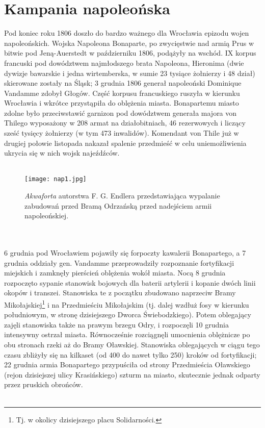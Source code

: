 \documentclass[12pt]{article}
\begin{document}
\section{Kampania napoleońska}

Pod koniec roku 1806 doszło do bardzo ważnego dla Wrocławia epizodu wojen napoleońskich. Wojska Napoleona Bonaparte, po zwycięstwie nad armią Prus w bitwie pod Jeną-Auerstedt w październiku 1806, podążyły na wschód. IX korpus francuski pod dowództwem najmłodszego brata Napoleona, Hieronima (dwie dywizje bawarskie i jedna wirtemberska, w sumie 23 tysiące żołnierzy i 48 dział) skierowane zostały na Śląsk; 3 grudnia 1806 generał napoleoński Dominique Vandamme zdobył Głogów. Część korpusu francuskiego ruszyła w kierunku Wrocławia i wkrótce przystąpiła do oblężenia miasta. Bonapartemu miasto zdolne było przeciwstawić garnizon pod dowództwem generała majora von Thilego wyposażony w 208 armat na działobitniach, 46 rezerwowych i liczący sześć tysięcy żołnierzy (w tym 473 inwalidów). Komendant von Thile już w drugiej połowie listopada nakazał spalenie przedmieść w celu uniemożliwienia ukrycia się w nich wojsk najeźdźców.\\\\
\begin{figure}[h]
    \centering
    \texttt{[image: nap1.jpg]}
    \caption{\textit{Akwaforta} autorstwa F. G. Endlera przedstawiająca wypalanie zabudowań przed Bramą Odrzańską przed nadejściem armii napoleońskiej.}
    \label{fig:nap1}
\end{figure}\\\\
6 grudnia pod Wrocławiem pojawiły się forpoczty kawalerii Bonapartego, a 7 grudnia oddziały gen. Vandamme przeprowadziły rozpoznanie fortyfikacji miejskich i zamknęły pierścień oblężenia wokół miasta. Nocą 8 grudnia rozpoczęto sypanie stanowisk bojowych dla baterii artylerii i kopanie dwóch linii okopów i transzei. Stanowiska te z początku zbudowano naprzeciw Bramy Mikołajskiej\footnote{Tj. w okolicy dzisiejszego placu Solidarności.} i na Przedmieściu Mikołajskim (tj. dalej wzdłuż fosy w kierunku południowym, w stronę dzisiejszego Dworca Świebodzkiego). Potem oblegający zajęli stanowiska także na prawym brzegu Odry, i rozpoczęli 10 grudnia intensywny ostrzał miasta. Równocześnie rozciągnęli umocnienia oblężnicze po obu stronach rzeki aż do Bramy Oławskiej. Stanowiska oblegających w ciągu tego czasu zbliżyły się na kilkaset (od 400 do nawet tylko 250) kroków od fortyfikacji; 22 grudnia armia Bonapartego przypuściła od strony Przedmieścia Oławskiego (rejon dzisiejszej ulicy Krasińskiego) szturm na miasto, skutecznie jednak odparty przez pruskich obrońców.\\\\
\end{document}
